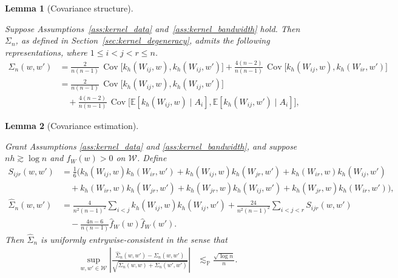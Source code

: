 \documentclass[11pt,lof]{puthesis}
\renewcommand{\P}{\ensuremath{\mathbb{P}}}
\newcommand{\E}{\ensuremath{\mathbb{E}}}
\newcommand{\cW}{\ensuremath{\mathcal{W}}}
\DeclareMathOperator{\Cov}{Cov}
\theoremstyle{break}
\newtheorem{lemma}{Lemma}[section]
\theoremstyle{proof}
\begin{document}
\begin{lemma}[Covariance structure]
\label{lem:kernel_app_covariance_structure}

Suppose Assumptions~\ref{ass:kernel_data} and~\ref{ass:kernel_bandwidth}
hold. Then $\Sigma_n$, as defined in Section~\ref{sec:kernel_degeneracy},
admits the following representations,
where $1 \leq i < j < r \leq n$.
%
\begin{align*}
\Sigma_n(w,w')
&=
\frac{2}{n(n-1)}
\,\Cov\!\big[
k_h(W_{i j},w),
k_h(W_{i j},w')
\big]
+
\frac{4(n-2)}{n(n-1)}
\,\Cov\!\big[
k_h(W_{i j},w),
k_h(W_{i r},w')
\big] \\
&=
\frac{2}{n(n-1)}
\,\Cov\!\big[
k_h(W_{i j},w),
k_h(W_{i j},w')
\big] \\
&\quad+
\frac{4(n-2)}{n(n-1)}
\,\Cov\!\big[
\E[k_h(W_{i j},w) \mid A_i],
\E[k_h(W_{i j},w') \mid A_i]
\big],
\end{align*}
%
\end{lemma}

\begin{lemma}[Covariance estimation]
\label{lem:kernel_app_covariance_estimation}

Grant Assumptions \ref{ass:kernel_data} and \ref{ass:kernel_bandwidth},
and suppose $n h \gtrsim \log n$ and $f_W(w) > 0$ on $\cW$. Define
%
\begin{align*}
S_{i j r}(w,w')
&=
\frac{1}{6}
\Big(
k_h(W_{i j},w)
k_h(W_{i r},w')
+ k_h(W_{i j},w)
k_h(W_{jr},w')
+ k_h(W_{i r},w)
k_h(W_{i j},w') \\
&\quad+
k_h(W_{i r},w)
k_h(W_{jr},w')
+ k_h(W_{jr},w)
k_h(W_{i j},w')
+ k_h(W_{jr},w)
k_h(W_{i r},w')
\Big), \\
\hat \Sigma_n(w,w')
&=
\frac{4}{n^2(n-1)^2}
\sum_{i<j}
k_h(W_{i j},w)
k_h(W_{i j},w')
+
\frac{24}{n^2(n-1)^2}
\sum_{i<j<r}
S_{i j r}(w,w') \\
&\quad-
\frac{4n-6}{n(n-1)}
\hat f_W(w)
\hat f_W(w').
\end{align*}
%
Then $\hat \Sigma_n$
is uniformly entrywise-consistent in the sense that
%
\begin{align*}
\sup_{w,w' \in \cW}
\left|
\frac{\hat \Sigma_n(w,w') - \Sigma_n(w,w')}
{\sqrt{\Sigma_n(w,w) + \Sigma_n(w',w')}}
\right|
&\lesssim_\P
\frac{\sqrt{\log n}}{n}.
\end{align*}

\end{lemma}
\end{document}
